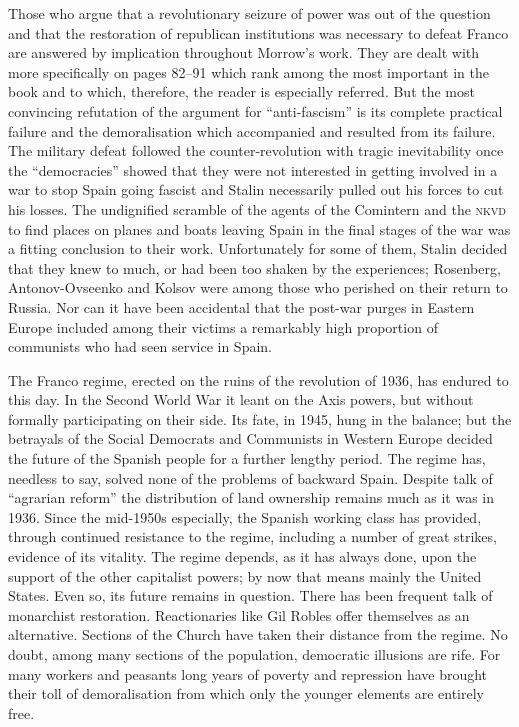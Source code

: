 Those who argue that a revolutionary seizure of power was out of the question and that the restoration of republican institutions was necessary to defeat Franco are answered by implication throughout Morrow’s work. They are dealt with more specifically on pages 82--91 which rank among the most important in the book and to which, therefore, the reader is especially referred. But the most convincing refutation of the argument for ``anti-fascism'' is its complete practical failure and the demoralisation which accompanied and resulted from its failure. The military defeat followed the counter-revolution with tragic inevitability once the ``democracies'' showed that they were not interested in getting involved in a war to stop Spain going fascist and Stalin necessarily pulled out his forces to cut his losses. The undignified scramble of the agents of the Comintern and the \textsc{nkvd} to find places on planes and boats leaving Spain in the final stages of the war was a fitting conclusion to their work. Unfortunately for some of them, Stalin decided that they knew to much, or had been too shaken by the experiences; Rosenberg, Antonov-Ovseenko and Kolsov were among those who perished on their return to Russia. Nor can it have been accidental that the post-war purges in Eastern Europe included among their victims a remarkably high proportion of communists who had seen service in Spain.

The Franco regime, erected on the ruins of the revolution of 1936, has endured to this day. In the Second World War it leant on the Axis powers, but without formally participating on their side. Its fate, in 1945, hung in the balance; but the betrayals of the Social Democrats and Communists in Western Europe decided the future of the Spanish people for a further lengthy period. The regime has, needless to say, solved none of the problems of backward Spain. Despite talk of ``agrarian reform'' the distribution of land ownership remains much as it was in 1936. Since the mid-1950s especially, the Spanish working class has provided, through continued resistance to the regime, including a number of great strikes, evidence of its vitality. The regime depends, as it has always done, upon the support of the other capitalist powers; by now that means mainly the United States. Even so, its future remains in question. There has been frequent talk of monarchist restoration. Reactionaries like Gil Robles{\indexGRobles} offer themselves as an alternative. Sections of the Church have taken their distance from the regime. No doubt, among many sections of the population, democratic illusions are rife. For many workers and peasants long years of poverty and repression have brought their toll of demoralisation from which only the younger elements are entirely free.

